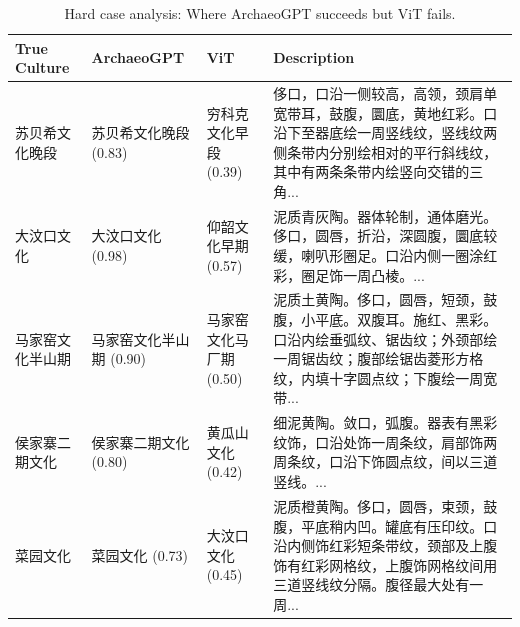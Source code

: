 \begin{table}[t]
\centering
\caption{Hard case analysis: Where ArchaeoGPT succeeds but ViT fails.}
\label{tab:hard_cases}
\small
\begin{tabular}{p{2cm} p{2.5cm} p{2.5cm} p{4.5cm}}
\toprule
True Culture & ArchaeoGPT & ViT & Description \\
\midrule
苏贝希文化晚段 & 苏贝希文化晚段 (0.83) & 穷科克文化早段 (0.39) & 侈口，口沿一侧较高，高领，颈肩单宽带耳，鼓腹，圜底，黄地红彩。口沿下至器底绘一周竖线纹，竖线纹两侧条带内分别绘相对的平行斜线纹，其中有两条条带内绘竖向交错的三角... \\
大汶口文化 & 大汶口文化 (0.98) & 仰韶文化早期 (0.57) & 泥质青灰陶。器体轮制，通体磨光。侈口，圆唇，折沿，深圆腹，圜底较缓，喇叭形圈足。口沿内侧一圈涂红彩，圈足饰一周凸棱。... \\
马家窑文化半山期 & 马家窑文化半山期 (0.90) & 马家窑文化马厂期 (0.50) & 泥质土黄陶。侈口，圆唇，短颈，鼓腹，小平底。双腹耳。施红、黑彩。口沿内绘垂弧纹、锯齿纹；外颈部绘一周锯齿纹；腹部绘锯齿菱形方格纹，内填十字圆点纹；下腹绘一周宽带... \\
侯家寨二期文化 & 侯家寨二期文化 (0.80) & 黄瓜山文化 (0.42) & 细泥黄陶。敛口，弧腹。器表有黑彩纹饰，口沿处饰一周条纹，肩部饰两周条纹，口沿下饰圆点纹，间以三道竖线。... \\
菜园文化 & 菜园文化 (0.73) & 大汶口文化 (0.45) & 泥质橙黄陶。侈口，圆唇，束颈，鼓腹，平底稍内凹。罐底有压印纹。口沿内侧饰红彩短条带纹，颈部及上腹饰有红彩网格纹，上腹饰网格纹间用三道竖线纹分隔。腹径最大处有一周... \\
\bottomrule
\end{tabular}
\end{table}